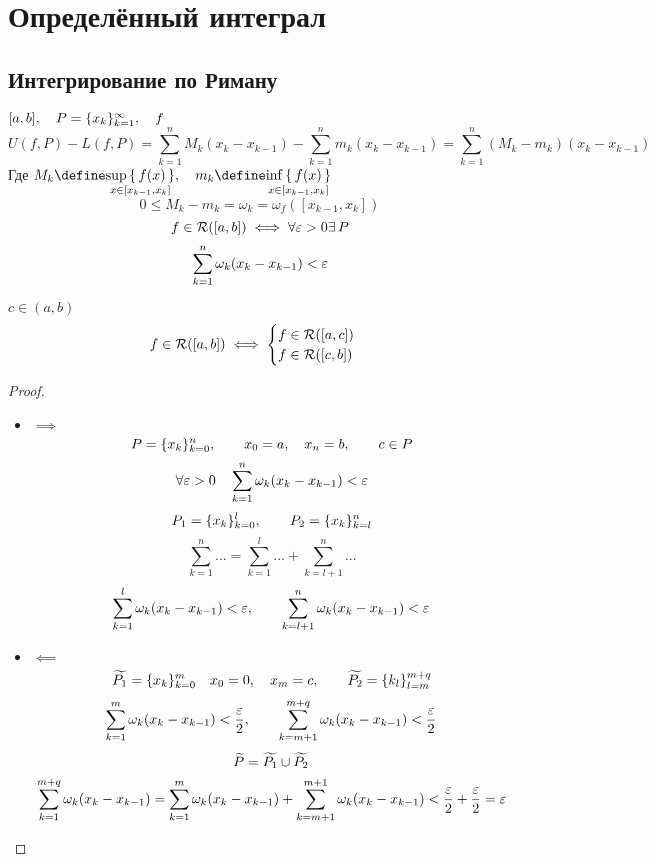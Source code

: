 \chapter{Определённый интеграл}

\section{Интегрирование по Риману}

\begin{statement}
	$ [a, b], \quad P = \seq{x_k}k, \quad f $
	$$ U(f, P) - L(f, P) = \sum_{k = 1}^n M_k(x_k - x_{k - 1}) - \sum_{k = 1}^n m_k(x_k - x_{k - 1}) = \sum_{k = 1}^n (M_k - m_k)(x_k - x_{k - 1}) $$
	Где $ M_k \define \underset{x \in [x_{k - 1}, x_k]}{\sup\set{f(x)}}, \quad m_k \define \underset{x \in [x_{k - 1}, x_k]}{\inf\set{f(x)}} $
	$$ 0 \le M_k - m_k = \omega_k = \omega_f([x_{k - 1}, x_k]) $$
	$$ f \in \Ri([a, b]) \iff \forall \veps > 0 \exist P $$
	$$ \sum_{k = 1}^n \omega_k (x_k - x_{k - 1}) < \veps $$
\end{statement}

\begin{theorem}
	$ c \in (a, b) $
	$$ f \in \Ri([a, b]) \iff
	\begin{cases}
		f \in \Ri([a, c]) \\
		f \in \Ri([c, b])
	\end{cases} $$
\end{theorem}

\begin{proof}
	\hfill
	\begin{itemize}
		\item $ \implies $
		$$ P = \seqz[n]{x_k}k, \qquad x_0 = a, \quad x_n = b, \qquad c \in P $$
		$$ \forall \veps > 0 \quad \sum_{k = 1}^n \omega_k(x_k - x_{k - 1}) < \veps $$
		$$ P_1 = \seqz[l]{x_k}k, \qquad P_2 = \seqv[n]{x_k}kl $$
		$$ \sum_{k = 1}^n ... = \sum_{k = 1}^l ... + \sum_{k = l + 1}^n ... $$
		$$ \sum_{k = 1}^l \omega_k (x_k - x_{k - 1}) < \veps, \qquad \sum_{k = l + 1}^n \omega_k (x_k - x_{k - 1}) < \veps $$
		\item $ \impliedby $
		$$ \vawe{P_1} = \seqz[m]{x_k}k \quad x_0 = 0, \quad x_m = c, \qquad \vawe{P_2} = \seqv[m + q]{k_l}lm $$
		$$ \sum_{k = 1}^m \omega_k(x_k - x_{k - 1}) < \frac\veps2, \qquad \sum_{k = m + 1}^{m + q} \omega_k (x_k - x_{k - 1}) < \frac\veps2 $$
		$$ \vawe{P} = \vawe{P_1} \cup \vawe{P_2} $$
		$$ \sum_{k = 1}^{m + q} \omega_k(x_k - x_{k - 1}) = \sum_{k = 1}^m \omega_k (x_k - x_{k - 1}) + \sum_{k = m + 1}^{m + 1} \omega_k (x_k - x_{k - 1}) < \frac\veps2 + \frac\veps2 = \veps $$
	\end{itemize}
\end{proof}

